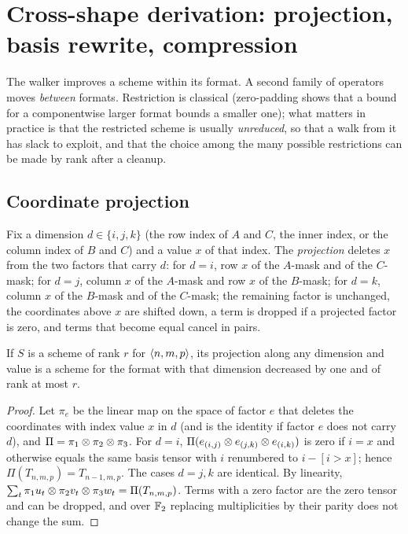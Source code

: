 \section{Cross-shape derivation: projection, basis rewrite, compression}\label{sec:derive}

The walker improves a scheme within its format. A second family of operators moves \emph{between} formats. Restriction is classical (zero-padding shows
that a bound for a componentwise larger format bounds a smaller one); what matters in practice is that the restricted scheme is usually \emph{unreduced}, so that a walk from it has
slack to exploit, and that the choice among the many possible restrictions can be made by rank after a cleanup.

\subsection{Coordinate projection}
Fix a dimension $d\in\{i,j,k\}$ (the row index of $A$ and $C$, the inner index, or the column index of $B$ and $C$) and a value $x$ of that index.
The \emph{projection} deletes $x$ from the two factors that carry $d$: for $d=i$, row $x$ of the $A$-mask and of the $C$-mask; for $d=j$, column $x$ of the $A$-mask and
row $x$ of the $B$-mask; for $d=k$, column $x$ of the $B$-mask and of the $C$-mask; the remaining factor is unchanged, the coordinates above $x$ are shifted down, a term
is dropped if a projected factor is zero, and terms that become equal cancel in pairs.

\begin{lemma}[projection]\label{lem:projection}
If $S$ is a scheme of rank $r$ for $\langle n,m,p\rangle$, its projection along any dimension and value is a scheme for the format with that dimension decreased by one and of rank at most $r$.
\end{lemma}
\begin{proof}
Let $\pi_e$ be the linear map on the space of factor $e$ that deletes the coordinates with index value $x$ in $d$ (and is the identity if factor $e$ does not carry $d$), and $\Pi=\pi_1\otimes\pi_2\otimes\pi_3$.
For $d=i$, $\Pi(e_{(i,j)}\otimes e_{(j,k)}\otimes e_{(i,k)})$ is zero if $i=x$ and otherwise equals the same basis tensor with $i$ renumbered to $i-[i>x]$; hence $\Pi(T_{n,m,p})=T_{n-1,m,p}$. The cases $d=j,k$ are identical.
By linearity, $\sum_t \pi_1u_t\otimes\pi_2v_t\otimes\pi_3w_t=\Pi(T_{n,m,p})$. Terms with a zero factor are the zero tensor and can be dropped, and over ${\mathbb{F}_2}$ replacing multiplicities by their parity does not change the sum.
\end{proof}

